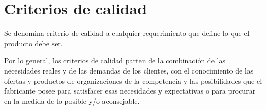 %
%
%

\section{Criterios de calidad}
Se denomina criterio de calidad a cualquier requerimiento que define lo que el
producto debe ser.

Por lo general, los criterios de calidad parten de la combinación de las
necesidades reales y de las demandas de los clientes, con el conocimiento de las
ofertas y productos de organizaciones de la competencia y las posibilidades que
el fabricante posee para satisfacer esas necesidades y expectativas o para
procurar en la medida de lo posible y/o aconsejable\cite{Haaz}.

